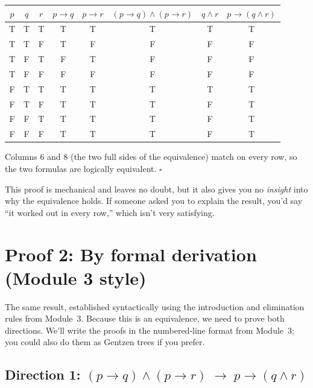 \documentclass[11pt]{article}
\begin{document}
\begin{center}
\begin{tabular}{ccc|cc|c|c|c}
\toprule
$p$ & $q$ & $r$ & $p \to q$ & $p \to r$ & $(p \to q) \wedge (p \to r)$ & $q \wedge r$ & $p \to (q \wedge r)$ \\
\midrule
T & T & T & T & T & T & T & T \\
T & T & F & T & F & F & F & F \\
T & F & T & F & T & F & F & F \\
T & F & F & F & F & F & F & F \\
F & T & T & T & T & T & T & T \\
F & T & F & T & T & T & F & T \\
F & F & T & T & T & T & F & T \\
F & F & F & T & T & T & F & T \\
\bottomrule
\end{tabular}
\end{center}

Columns 6 and 8 (the two full sides of the equivalence) match on every row, so the two formulas are logically equivalent. \hfill$\square$

This proof is mechanical and leaves no doubt, but it also gives you no \emph{insight} into why the equivalence holds. If someone asked you to explain the result, you'd say ``it worked out in every row,'' which isn't very satisfying.

\section*{Proof 2: By formal derivation (Module 3 style)}

The same result, established syntactically using the introduction and elimination rules from Module~3. Because this is an equivalence, we need to prove both directions. We'll write the proofs in the numbered-line format from Module~3; you could also do them as Gentzen trees if you prefer.

\subsection*{Direction 1: $(p \to q) \wedge (p \to r) \;\to\; p \to (q \wedge r)$}
\end{document}
